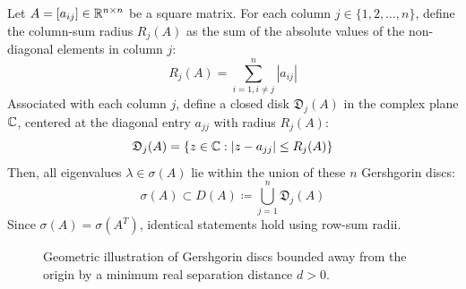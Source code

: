 \begin{theo}\label{thm:gershgorin_detailed}
Let $A = [a_{ij}] \in \mathbb{R}^{n \times n}$ be a square matrix. For each column $j \in \{1, 2, \dots, n\}$, define the column-sum radius $R_j(A)$ as the sum of the absolute values of the non-diagonal elements in column $j$:
\begin{equation}\label{eq:gershgorin_radius}
    R_j(A) = \sum_{i=1, i \neq j}^{n} |a_{ij}|
\end{equation}
Associated with each column $j$, define a closed disk $\mathfrak{D}_j(A)$ in the complex plane $\mathbb{C}$, centered at the diagonal entry $a_{jj}$ with radius $R_j(A)$:
\begin{equation}\label{eq:gershgorin_disc}
    \mathfrak{D}_j(A) = \left\{ z \in \mathbb{C} : |z - a_{jj}| \le R_j(A) \right\}
\end{equation}
Then, all eigenvalues $\lambda \in \sigma(A)$ lie within the union of these $n$ Gershgorin discs:
\begin{equation}
    \sigma(A) \subset D(A) \coloneqq \bigcup_{j=1}^{n} \mathfrak{D}_j(A)
\end{equation}
Since $\sigma(A) = \sigma(A^T)$, identical statements hold using row-sum radii.
\end{theo}

\begin{figure}[ht!]
    \centering
    \caption{Geometric illustration of Gershgorin discs bounded away from the origin by a minimum real separation distance $d > 0$.}
    \label{fig:gershgorin_concept}
\end{figure}

